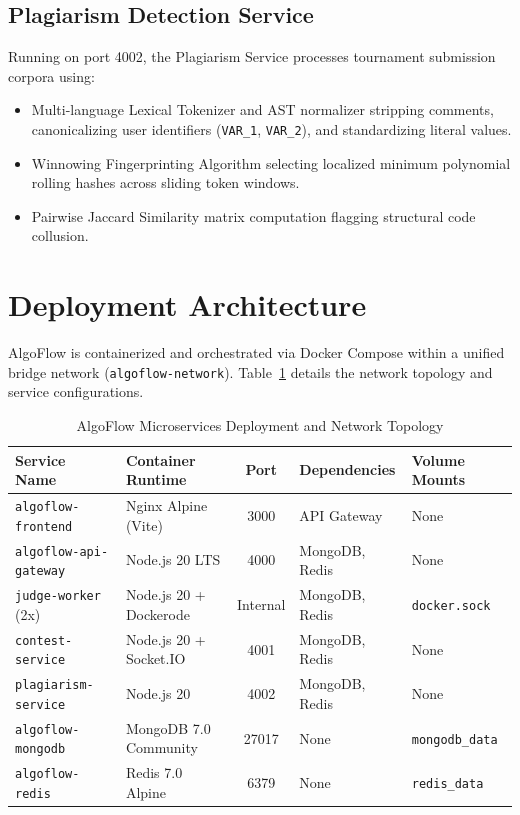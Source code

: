 \documentclass[12pt,a4paper]{report}
\begin{document}
\subsection{Plagiarism Detection Service}
Running on port 4002, the Plagiarism Service processes tournament submission corpora using:
\begin{itemize}[leftmargin=*]
  \item Multi-language Lexical Tokenizer and AST normalizer stripping comments, canonicalizing user identifiers (\texttt{VAR\_1}, \texttt{VAR\_2}), and standardizing literal values.
  \item Winnowing Fingerprinting Algorithm selecting localized minimum polynomial rolling hashes across sliding token windows.
  \item Pairwise Jaccard Similarity matrix computation flagging structural code collusion.
\end{itemize}

\section{Deployment Architecture}
AlgoFlow is containerized and orchestrated via Docker Compose within a unified bridge network (\texttt{algoflow-network}). Table~\ref{tab:port_allocations} details the network topology and service configurations.

\begin{table}[H]
\centering
\small
\setlength{\tabcolsep}{4pt}
\renewcommand{\arraystretch}{1.2}
\caption{AlgoFlow Microservices Deployment and Network Topology}
\label{tab:port_allocations}
\begin{tabularx}{\textwidth}{@{}l l c >{\raggedright\arraybackslash}p{2.6cm} >{\raggedright\arraybackslash}X@{}}
\toprule
\textbf{Service Name} & \textbf{Container Runtime} & \textbf{Port} & \textbf{Dependencies} & \textbf{Volume Mounts} \\ \midrule
\texttt{algoflow-frontend} & Nginx Alpine (Vite) & 3000 & API Gateway & None \\
\texttt{algoflow-api-gateway} & Node.js 20 LTS & 4000 & MongoDB, Redis & None \\
\texttt{judge-worker} (2x) & Node.js 20 + Dockerode & Internal & MongoDB, Redis & \texttt{docker.sock} \\
\texttt{contest-service} & Node.js 20 + Socket.IO & 4001 & MongoDB, Redis & None \\
\texttt{plagiarism-service} & Node.js 20 & 4002 & MongoDB, Redis & None \\
\texttt{algoflow-mongodb} & MongoDB 7.0 Community & 27017 & None & \texttt{mongodb\_data} \\
\texttt{algoflow-redis} & Redis 7.0 Alpine & 6379 & None & \texttt{redis\_data} \\ \bottomrule
\end{tabularx}
\end{table}
\end{document}
